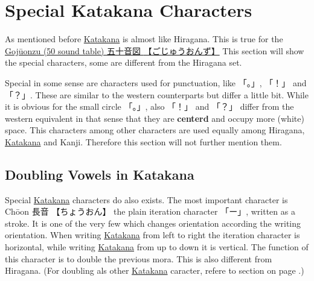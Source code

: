 \section{Special Katakana Characters}
\label{sec:SpecialKatakanaCharacters}


As mentioned before \hyperref[sec:Katakana]{Katakana} is almost like Hiragana.
This is true for the \hyperref[sec:Gojuonzu]{Gojūonzu (50 sound table)  {五十音図}
{【ごじゅうおんず】}} This section will show the special characters, some are
different from the Hiragana set.

Special in some sense are characters used for punctuation, like {「。」},
{「！」} and {「？」}.  These are similar to the western counterparts but
differ a little bit. While it is obvious for the small circle {「。」}, also
{「！」} and {「？」} differ from the western equivalent in that sense that
they are \textbf{centerd} and occupy more (white) space. This characters among
other characters are used equally among Hiragana,
\hyperref[sec:Katakana]{Katakana} and Kanji. Therefore this section will not
further mention them.


\subsection{Doubling Vowels in Katakana}
\label{subsec:DoublingVowelsInKatakana}
\label{subsec:DoublingVowels}
\label{sec:DoublingVowelsInKatakana}
\label{sec:DoublingVowels}


Special \hyperref[sec:Katakana]{Katakana} characters do also exists. The most
important character is Chōon {長音} {【ちょうおん】} the plain iteration
character {「ー」}, written as a stroke. It is one of the very few which
changes orientation according the writing orientation. When writing
\hyperref[sec:Katakana]{Katakana} from left to right the iteration character is
horizontal, while writing \hyperref[sec:Katakana]{Katakana} from up to down it
is vertical. The function of this character is to double the previous mora.
This is also different from Hiragana. (For doubling als other
\hyperref[sec:Katakana]{Katakana} caracter, refere to section
 on page \pageref{sec:Iteration}.)

